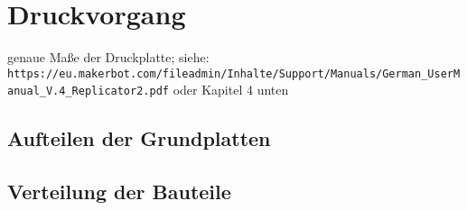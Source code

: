 \section{Druckvorgang}
genaue Maße der Druckplatte; siehe: 
\verb|https://eu.makerbot.com/fileadmin/Inhalte/Support/Manuals/German_UserManual_V.4_Replicator2.pdf|
oder Kapitel 4 unten

\subsection{Aufteilen der Grundplatten}

\subsection{Verteilung der Bauteile}
